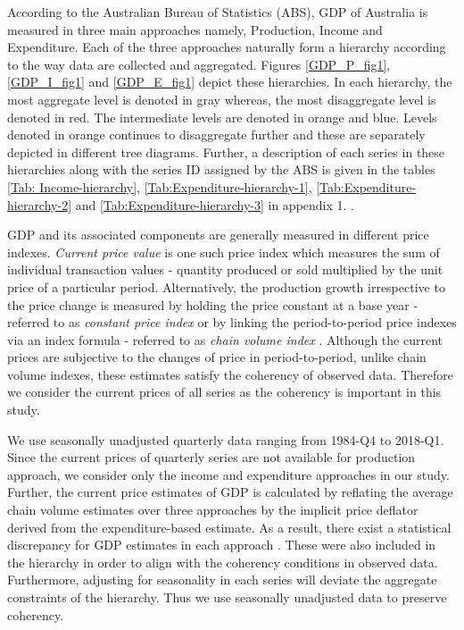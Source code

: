 \documentclass[graybox]{svmult}
\begin{document}
According to the Australian Bureau of Statistics (ABS), GDP of Australia is measured in three main approaches namely, Production, Income and Expenditure. Each of the three approaches naturally form a hierarchy according to the way data are collected and aggregated. Figures \ref{GDP_P_fig1}, \ref{GDP_I_fig1} and \ref{GDP_E_fig1} depict these hierarchies. In each hierarchy, the most aggregate level is denoted in gray whereas, the most disaggregate level is denoted in red. The intermediate levels are denoted in orange and blue. Levels denoted in orange continues to disaggregate further and these are separately depicted in different tree diagrams. Further, a description of each series in these hierarchies along with the series ID assigned by the ABS is given in the tables \ref{Tab: Income-hierarchy}, \ref{Tab:Expenditure-hierarchy-1}, \ref{Tab:Expenditure-hierarchy-2} and \ref{Tab:Expenditure-hierarchy-3} in appendix 1.
.

GDP and its associated components are generally measured in different price indexes. \textit{Current price value} is one such price index which measures the sum of individual transaction values - quantity produced or sold multiplied by the unit price of a particular period. Alternatively, the production growth irrespective to the price change is measured by holding the price constant at a base year - referred to as \textit{constant price index} or by linking the period-to-period price indexes via an index formula - referred to as \textit{chain volume index} \citep{ABS2015}. Although the current prices are subjective to the changes of price in period-to-period, unlike chain volume indexes, these estimates satisfy the coherency of observed data. Therefore we consider the current prices of all series as the coherency is important in this study.

We use seasonally unadjusted quarterly data ranging from 1984-Q4 to 2018-Q1. Since the current prices of quarterly series are not available for production approach, we consider only the income and expenditure approaches in our study. Further, the current price estimates of GDP is calculated by reflating the average chain volume estimates over three approaches by the implicit price deflator derived from the expenditure-based estimate. As a result, there exist a statistical discrepancy for GDP estimates in each approach \citep{ABS2018}. These were also included in the hierarchy in order to align with the coherency conditions in observed data. Furthermore, adjusting for seasonality in each series will deviate the aggregate constraints of the hierarchy. Thus we use seasonally unadjusted data to preserve coherency.
\end{document}
